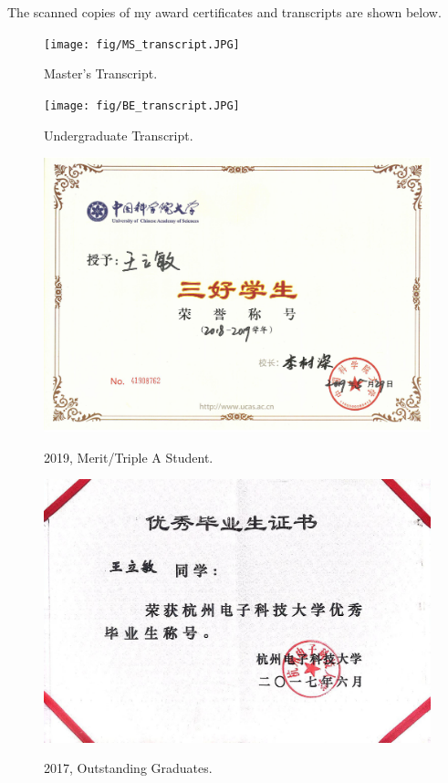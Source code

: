 \documentclass[11pt]{article}
\begin{document}
{The scanned copies of my award certificates and transcripts are shown below.

\begin{figure}[ht]
	\centering
	\texttt{[image: fig/MS\_transcript.JPG]}\\
	\caption{Master's Transcript.}
\end{figure}
	
\begin{figure}[ht]
	\centering
	\texttt{[image: fig/BE\_transcript.JPG]}\\
	\caption{Undergraduate Transcript.}
\end{figure}

\begin{figure}[ht]
	\centering
	\includegraphics[width=14cm]{fig/cer1.jpg}\\
	\caption{2019, Merit/Triple A Student.}
\end{figure}

\begin{figure}[ht]
	\centering
	\includegraphics[width=14cm]{fig/cer2.jpg}\\
	\caption{2017, Outstanding Graduates.}
\end{figure}

}
\end{document}
